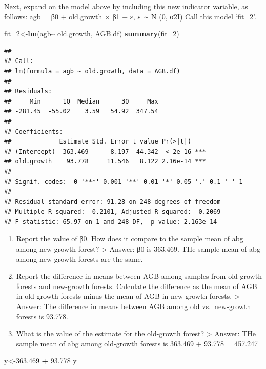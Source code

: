 \documentclass[
]{article}
\newenvironment{Shaded}{\begin{snugshade}}{\end{snugshade}}
\newcommand{\FloatTok}[1]{\textcolor[rgb]{0.00,0.00,0.81}{#1}}
\newcommand{\FunctionTok}[1]{\textcolor[rgb]{0.13,0.29,0.53}{\textbf{#1}}}
\newcommand{\NormalTok}[1]{#1}
\newcommand{\OtherTok}[1]{\textcolor[rgb]{0.56,0.35,0.01}{#1}}
\newcommand{\SpecialCharTok}[1]{\textcolor[rgb]{0.81,0.36,0.00}{\textbf{#1}}}
\begin{document}
Next, expand on the model above by including this new indicator
variable, as follows: agb = β0 + old.growth × β1 + ε, ε ∼ N (0, σ2I)
Call this model `fit\_2'.

\begin{Shaded}
\begin{Highlighting}[]
\NormalTok{fit\_2}\OtherTok{\textless{}{-}}\FunctionTok{lm}\NormalTok{(agb}\SpecialCharTok{\textasciitilde{}}\NormalTok{ old.growth, AGB.df)}
\FunctionTok{summary}\NormalTok{(fit\_2)}
\end{Highlighting}
\end{Shaded}

\begin{verbatim}
## 
## Call:
## lm(formula = agb ~ old.growth, data = AGB.df)
## 
## Residuals:
##     Min      1Q  Median      3Q     Max 
## -281.45  -55.02    3.59   54.92  347.54 
## 
## Coefficients:
##             Estimate Std. Error t value Pr(>|t|)    
## (Intercept)  363.469      8.197  44.342  < 2e-16 ***
## old.growth    93.778     11.546   8.122 2.16e-14 ***
## ---
## Signif. codes:  0 '***' 0.001 '**' 0.01 '*' 0.05 '.' 0.1 ' ' 1
## 
## Residual standard error: 91.28 on 248 degrees of freedom
## Multiple R-squared:  0.2101, Adjusted R-squared:  0.2069 
## F-statistic: 65.97 on 1 and 248 DF,  p-value: 2.163e-14
\end{verbatim}

\begin{enumerate}
\def\labelenumi{\alph{enumi}.}
\item
  Report the value of β0. How does it compare to the sample mean of abg
  among new-growth forest? \textgreater{} Answer: β0 is 363.469. THe
  sample mean of abg among new-growth forests are the same.
\item
  Report the difference in means between AGB among samples from
  old-growth forests and new-growth forests. Calculate the difference as
  the mean of AGB in old-growth forests minus the mean of AGB in
  new-growth forests. \textgreater{} Answer: The difference in means
  between AGB among old vs.~new-growth forests is 93.778.
\item
  What is the value of the estimate for the old-growth forest?
  \textgreater{} Answer: THe sample mean of abg among old-growth forests
  is 363.469 + 93.778 = 457.247
\end{enumerate}

\begin{Shaded}
\begin{Highlighting}[]
\NormalTok{y}\OtherTok{\textless{}{-}}\FloatTok{363.469} \SpecialCharTok{+} \FloatTok{93.778}
\NormalTok{y}
\end{Highlighting}
\end{Shaded}
\end{document}

